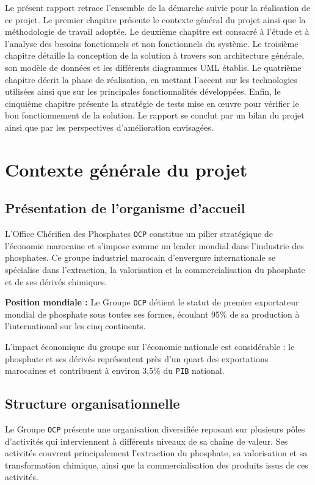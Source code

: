 \documentclass[14pt,a4paper]{article}
\begin{document}
Le présent rapport retrace l'ensemble de la démarche suivie pour la réalisation de ce projet. Le premier chapitre présente le contexte général du projet ainsi que la méthodologie de travail adoptée. Le deuxième chapitre est consacré à l'étude et à l'analyse des besoins fonctionnels et non fonctionnels du système. Le troisième chapitre détaille la conception de la solution à travers son architecture générale, son modèle de données et les différents diagrammes UML établis. Le quatrième chapitre décrit la phase de réalisation, en mettant l'accent sur les technologies utilisées ainsi que sur les principales fonctionnalités développées. Enfin, le cinquième chapitre présente la stratégie de tests mise en œuvre pour vérifier le bon fonctionnement de la solution. Le rapport se conclut par un bilan du projet ainsi que par les perspectives d'amélioration envisagées.


\newpage
\section{Contexte générale du projet}

\subsection{Présentation de l'organisme d'accueil}
L'Office Chérifien des Phosphates \texttt{\large OCP} constitue un pilier stratégique de l'économie marocaine et s'impose comme un leader mondial dans l'industrie des phosphates. Ce groupe industriel marocain d'envergure internationale se spécialise dans l'extraction, la valorisation et la commercialisation du phosphate et de ses dérivés chimiques.

\begin{answerbox}
\textbf{Position mondiale :} Le Groupe \texttt{\large OCP} détient le statut de premier exportateur mondial de phosphate sous toutes ses formes, écoulant 95\% de sa production à l'international sur les cinq continents.
\end{answerbox}

L'impact économique du groupe sur l'économie nationale est considérable : le phosphate et ses dérivés représentent près d'un quart des exportations marocaines et contribuent à environ 3,5\% du \texttt{PIB} national.

\subsection{Structure organisationnelle}
Le Groupe \texttt{\large OCP} présente une organisation diversifiée reposant sur plusieurs pôles d'activités qui interviennent à différents niveaux de sa chaîne de valeur. Ses activités couvrent principalement l'extraction du phosphate, sa valorisation et sa transformation chimique, ainsi que la commercialisation des produits issus de ces activités.
\end{document}
